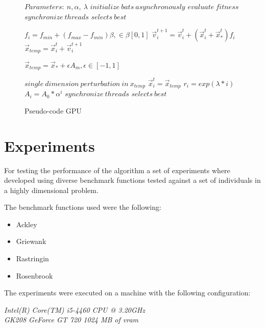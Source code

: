 \documentclass[conference]{IEEEtran}
\begin{document}
\begin{figure}
\begin{algorithmic}[1]
\State $Parameters:\ n,\alpha,\ \lambda$
\State $initialize\ bats\ asynchronously$
\State $evaluate\ fitness$
\State $synchronize\ threads$
\State $selects\ best$

        \State $f_i=f_{min} + (f_{max} - f_{min})\beta, \in \beta [0,1]$
        \State $\vec{v}_i^{t+1} = \vec{v}_i^{t} + (\vec{x}_i^{t} + \vec{x}_*^{t})f_i$
        \State $\vec{x}_{temp} = \vec{x}_i^{t} + \vec{v}_i^{t+1}$


            \State $\vec{x}_{temp} = \vec{x}_* + \epsilon A_m, \epsilon \in [-1, 1]$
        \EndIf

        \State $single\ dimension\ perturbation\ in\ x_{temp}$
            \State $\vec{x}_i^t = \vec{x}_{temp}$
            \State $r_i = exp(\lambda * i)$
            \State $A_i =  A_{0} * \alpha^i$
        \EndIf
        \State $synchronize\ threads$
        \State $selects\ best$
    \EndFor
\EndWhile
\end{algorithmic}
\caption{Pseudo-code GPU}\label{GPU}
\end{figure}

\section{Experiments}

For testing the performance of the algorithm a set of experiments where
developed using diverse benchmark functions tested against a set of
individuals in a highly dimensional problem.

The benchmark functions used were the following:

\begin{itemize}
    \item Ackley
    \item Griewank
    \item Rastringin
    \item Rosenbrook
\end{itemize}

The experiments were executed on a machine with the following configuration:

\textit{Intel(R) Core(TM) i5-4460  CPU @ 3.20GHz \\ GK208 GeForce GT 720 1024 MB of vram}
\end{document}
